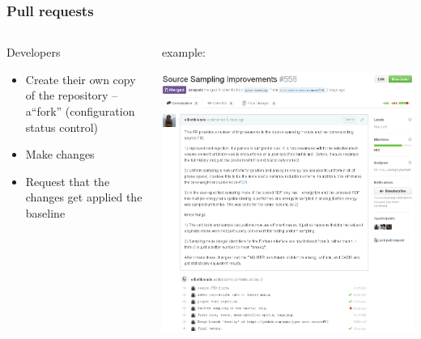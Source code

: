 \documentclass[12pt]{beamer}
\begin{document}
\begin{frame}
\frametitle{Pull requests}

\begin{columns}
\begin{column}{0.5\textwidth}

Developers
    \begin{itemize}
    \item Create their own copy of the repository -- a``fork'' (\alert{configuration status control})
    \item Make changes
    \item Request that the changes get applied the baseline
    \end{itemize}
\end{column}
\begin{column}{0.5\textwidth}
    \centerline{example:}
    \includegraphics[width=\textwidth]{figures/PR_prop.png}
\end{column}
\end{columns}

\end{frame}
\end{document}
